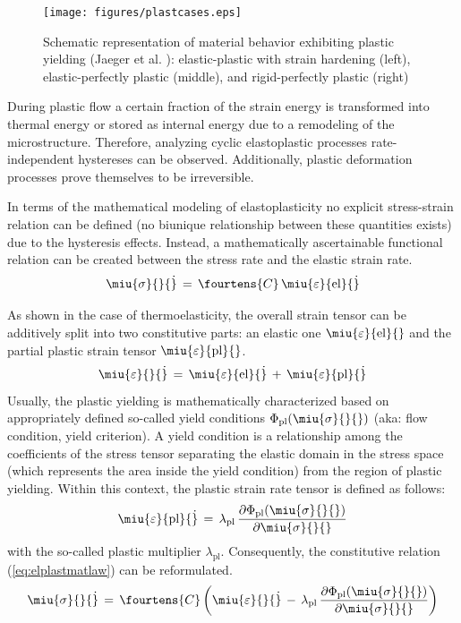 \begin{figure}[htb!]
\begin{center}
\footnotesize
\texttt{[image: figures/plastcases.eps]}
\caption{Schematic representation of material behavior exhibiting plastic yielding (Jaeger et al. \cite{JCZ:2007}): elastic-plastic with
strain hardening (left), elastic-perfectly plastic (middle), and rigid-perfectly plastic (right)}
\label{fig:plastcases}
\end{center}
\end{figure}

During plastic flow a certain fraction of the strain energy is transformed into thermal energy or stored as internal energy due to a
remodeling of the microstructure. Therefore, analyzing cyclic elastoplastic processes rate-independent hystereses can be observed.
Additionally, plastic deformation processes prove themselves to be irreversible.

In terms of the mathematical modeling of elastoplasticity no explicit stress-strain relation can be defined (no biunique relationship
between these quantities exists) due to the hysteresis effects. Instead, a mathematically ascertainable functional relation can be created
between the stress rate and the elastic strain rate.
\begin{equation}
\miu{\sigma}{}{\dot}\,=\,\fourtens{C}\,\miu{\varepsilon}{\mathrm{el}}{\dot}
\label{eq:elplastmatlaw}
\end{equation}

As shown in the case of thermoelasticity, the overall strain tensor can be additively split into two constitutive parts: an elastic one
$\miu{\varepsilon}{\mathrm{el}}{}$ and the partial plastic strain tensor $\miu{\varepsilon}{\mathrm{pl}}{}$.
\begin{equation}
\miu{\varepsilon}{}{\dot}\,=\,\miu{\varepsilon}{\mathrm{el}}{\dot}\,+\,\miu{\varepsilon}{\mathrm{pl}}{\dot}
\label{eq:strainsplit_pl}
\end{equation}
Usually, the plastic yielding is mathematically characterized based on appropriately defined so-called yield conditions $\Phi_{\mathrm{pl}}(\miu{\sigma}{}{})$ (aka: flow condition, yield criterion). A yield condition is a relationship among the coefficients of the stress tensor separating the elastic domain in the stress space (which represents the area inside the yield condition) from the region of plastic yielding. Within this context, the plastic strain rate tensor is defined as follows:
\begin{equation}
\miu{\varepsilon}{\mathrm{pl}}{\dot}\,=\,
\lambda_{\mathrm{pl}}\,\frac{\partial\Phi_{\mathrm{pl}}(\miu{\sigma}{}{})}{\partial\miu{\sigma}{}{}}
\label{eq:plaststrainrate}
\end{equation}
with the so-called plastic multiplier $\lambda_{\mathrm{pl}}$. Consequently, the constitutive relation (\ref{eq:elplastmatlaw}) can be
reformulated. 
\begin{equation}
\miu{\sigma}{}{\dot}\,=\,\fourtens{C}
\left(\miu{\varepsilon}{}{\dot}\,-\,
\lambda_{\mathrm{pl}}\,\frac{\partial\Phi_{\mathrm{pl}}(\miu{\sigma}{}{})}{\partial\miu{\sigma}{}{}}
\right)
\label{eq:elplastmatlawmod}
\end{equation}

